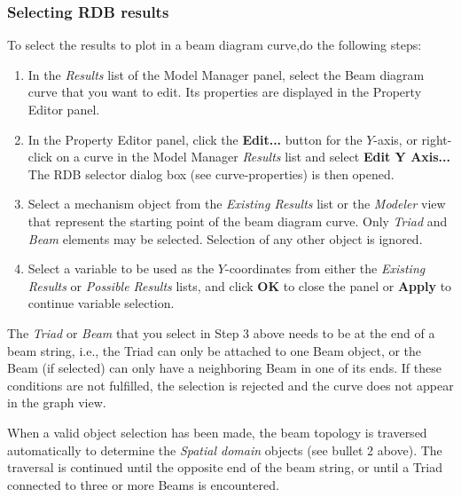 \subsubsection{Selecting RDB results}

To select the results to plot in a beam diagram curve,do the following steps:

\begin{enumerate}
\item
  In the {\sl Results} list of the Model Manager panel, select the Beam diagram
  curve that you want to edit. Its properties are displayed in the Property
  Editor panel.
\item
  In the Property Editor panel, click the \textbf{Edit...} button for the
  $Y$-axis, or right-click on a curve in the Model Manager {\sl Results} list
  and select \textbf{Edit Y Axis...} The RDB selector dialog box (see
                {curve-properties}) is then opened.
\item
  Select a mechanism object from the {\sl Existing Results} list or the
  {\sl Modeler} view that represent the starting point of the beam diagram
  curve. Only {\sl Triad} and {\sl Beam} elements may be selected.
  Selection of any other object is ignored.

\item
  Select a variable to be used as the $Y$-coordinates from either the
  {\sl Existing Results} or {\sl Possible Results} lists, and click \textbf{OK}
  to close the panel or \textbf{Apply} to continue variable selection.
\end{enumerate}

The {\sl Triad} or {\sl Beam} that you select in Step 3 above needs to be at the
end of a beam string, i.e., the Triad can only be attached to one Beam object,
or the Beam (if selected) can only have a neighboring Beam in one of its ends.
If these conditions are not fulfilled, the selection is rejected and the curve
does not appear in the graph view.

When a valid object selection has been made, the beam topology is traversed
automatically to determine the {\sl Spatial domain} objects
(see bullet 2 above). The traversal is continued until the opposite end of the
beam string, or until a Triad connected to three or more Beams is encountered.

